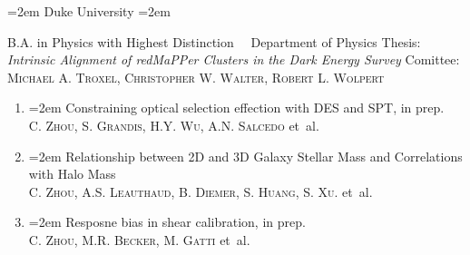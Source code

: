 \documentclass{scrartcl}
\newcommand{\MarginText}[1]{\marginpar{\raggedleft\itshape\small#1}} %
\newlength{\datebox}\settowidth{\datebox}{Spring 2011} %
\newcommand{\NewEntry}[3]{\noindent\hangindent=2em\hangafter=0 \parbox{\datebox}{\small \textit{#1}}\hspace{1.5em} #2 #3 %
\vspace{0.5em}} %
\newcommand{\School}[1]{\noindent\hangindent=2em\hangafter=0 #1  %
\vspace{0.5em}} %
\newcommand{\paper}[1]{\noindent\hangindent=2em\hangafter=0 \footnotesize #1  %
\vspace{0.5em}} %
\newcommand{\Description}[1]{\hangindent=2em\hangafter=0\noindent\raggedright\footnotesize{#1}\par\normalsize\vspace{1em}} %
\begin{document}
\begin{cv}{}
    \School{Duke University} \newline
    \Description{\MarginText{2020}B.A. in Physics with Highest Distinction\ \  \newline
        Department of Physics \newline
        Thesis: \textit{Intrinsic Alignment of redMaPPer Clusters in the Dark Energy
            Survey}\newline
        Comittee:  \textsc{Michael A. Troxel}, \textsc{Christopher W. Walter}, \textsc{Robert L. Wolpert} }








    \vspace{1em} %

    \vspace{0.2em}
    \begin{enumerate}
    \item \paper{Constraining optical selection effection with DES and SPT, in prep.}\\
    \textsc{C. Zhou, S. Grandis, H.Y. Wu, A.N. Salcedo} et~al.

    \item \paper{Relationship between 2D and 3D Galaxy Stellar Mass and Correlations with Halo Mass}\\
    \textsc{C. Zhou, A.S. Leauthaud, B. Diemer, S. Huang, S. Xu.} et~al.

    \item \paper{Resposne bias in shear calibration, in prep.}\\
    \textsc{C. Zhou, M.R. Becker, M. Gatti} et~al.


\end{enumerate}
\end{cv}
\end{document}
